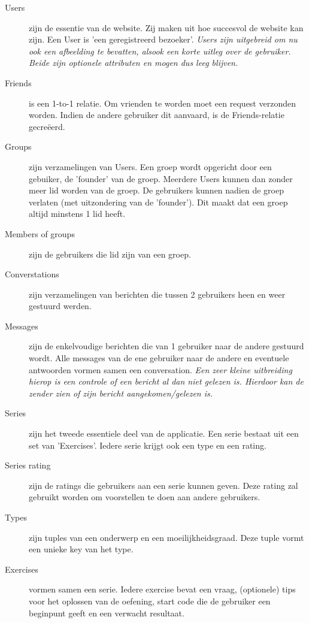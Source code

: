 \begin{description}
    \item[Users] zijn de essentie van de website. Zij maken uit hoe succesvol de website kan zijn.
        Een User is 'een geregistreerd bezoeker'. \textsl{Users zijn uitgebreid om nu ook een afbeelding
        te bevatten, alsook een korte uitleg over de gebruiker. Beide zijn optionele attributen en mogen
        dus leeg blijven.}
    \item[Friends] is een 1-to-1 relatie. Om vrienden te worden moet een request verzonden worden.
        Indien de andere gebruiker dit aanvaard, is de Friends-relatie gecre\"{e}erd.
    \item[Groups] zijn verzamelingen van Users. Een groep wordt opgericht door een gebuiker, de 'founder'
        van de groep. Meerdere Users kunnen dan zonder meer lid worden van de groep. De gebruikers kunnen
        nadien de groep verlaten (met uitzondering van de 'founder'). Dit maakt dat een groep altijd minstens
        1 lid heeft.
    \item[Members of groups] zijn de gebruikers die lid zijn van een groep.
    \item[Converstations] zijn verzamelingen van berichten die tussen 2 gebruikers heen en weer gestuurd
        werden.
    \item[Messages] zijn de enkelvoudige berichten die van 1 gebruiker naar de andere gestuurd wordt.
        Alle messages van de ene gebruiker naar de andere en eventuele antwoorden vormen samen een conversation.
        \textsl{Een zeer kleine uitbreiding hierop is een controle of een bericht al dan niet gelezen is. Hierdoor
        kan de zender zien of zijn bericht aangekomen/gelezen is.}
    \item[Series] zijn het tweede essentiele deel van de applicatie. Een serie bestaat uit een set
        van 'Exercises'. Iedere serie krijgt ook een type en een rating.
    \item[Series rating] zijn de ratings die gebruikers aan een serie kunnen geven. Deze rating
        zal gebruikt worden om voorstellen te doen aan andere gebruikers.
    \item[Types] zijn tuples van een onderwerp en een moeilijkheidsgraad. Deze tuple vormt een
        unieke key van het type.
    \item[Exercises] vormen samen een serie. Iedere exercise bevat een vraag, (optionele) tips voor
        het oplossen van de oefening, start code die de gebruiker een beginpunt geeft en een verwacht resultaat.

\end{description}
